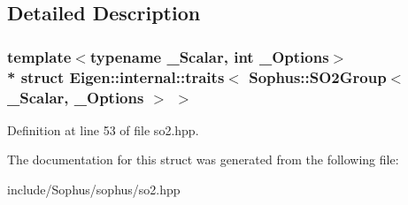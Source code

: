 \subsection{Detailed Description}
\subsubsection*{template$<$typename \+\_\+\+Scalar, int \+\_\+\+Options$>$\\*
struct Eigen\+::internal\+::traits$<$ Sophus\+::\+S\+O2\+Group$<$ \+\_\+\+Scalar, \+\_\+\+Options $>$ $>$}



Definition at line 53 of file so2.\+hpp.



The documentation for this struct was generated from the following file\+:\begin{DoxyCompactItemize}
\item 
include/\+Sophus/sophus/so2.\+hpp\end{DoxyCompactItemize}
